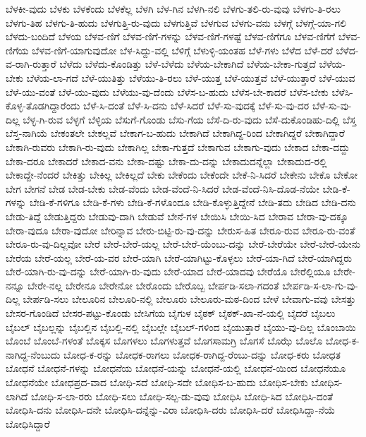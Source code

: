 {ಬೆಳಕೀ-ವುದು
ಬೆಳಕು
ಬೆಳಕೆಂದು
ಬೆಳಕೆಲ್ಲ
ಬೆಳಗಿ
ಬೆಳ-ಗಿನ
ಬೆಳಗಿ-ನಲಿ
ಬೆಳಗು-ತಲಿ-ರು-ವುವು
ಬೆಳಗು-ತಿ-ರಲು
ಬೆಳಗು-ತಿಹ
ಬೆಳಗು-ತಿ-ಹುದು
ಬೆಳಗುತ್ತಿ-ರು-ವುದು
ಬೆಳಗುತ್ತಿವೆ
ಬೆಳಗುವ
ಬೆಳಗು-ವನು
ಬೆಳಗ್ಗೆ
ಬೆಳಗ್ಗೆ-ಯಾ-ಗಲಿ
ಬೆಳದು-ಬಂದಿದೆ
ಬೆಳಯ
ಬೆಳವ-ಣಿಗೆ
ಬೆಳವ-ಣಿಗೆ-ಗಳನ್ನು
ಬೆಳವ-ಣಿಗೆ-ಗಳಷ್ಟೆ
ಬೆಳವ-ಣಿಗೆಗೂ
ಬೆಳವ-ಣಿಗೆಗೆ
ಬೆಳವ-ಣಿಗೆಯ
ಬೆಳವ-ಣಿಗೆ-ಯಾಗುವುದೋ
ಬೆಳ-ಸಿದ್ದು-ವಲ್ಲಿ
ಬೆಳಿಗ್ಗೆ
ಬೆಳುಳ್ಳಿ-ಯಂತಹ
ಬೆಳೆ-ಗಳು
ಬೆಳೆದ
ಬೆಳೆ-ದರೆ
ಬೆಳೆದ-ವ-ರಾಗಿ-ರುತ್ತಾರೆ
ಬೆಳೆದು
ಬೆಳೆದು-ಕೊಂಡಿತ್ತು
ಬೆಳೆ-ಬೆಳೆದು
ಬೆಳೆಯ-ಬೇಕಾಗಿದೆ
ಬೆಳೆಯ-ಬೇಕಾ-ಗುತ್ತದೆ
ಬೆಳೆಯ-ಬೇಕು
ಬೆಳೆಯ-ಲಾ-ಗದೆ
ಬೆಳೆ-ಯುತಿತ್ತು
ಬೆಳೆಯು-ತಿ-ರಲು
ಬೆಳೆ-ಯುತ್ತ
ಬೆಳೆ-ಯುತ್ತವೆ
ಬೆಳೆ-ಯುತ್ತಾರೆ
ಬೆಳೆ-ಯುವ
ಬೆಳೆ-ಯು-ವಂತೆ
ಬೆಳೆ-ಯು-ವುದು
ಬೆಳೆಯು-ವು-ದೆಂದು
ಬೆಳೆಸ-ಬ-ಹುದು
ಬೆಳೆಸ-ಬೇ-ಕಾದರೆ
ಬೆಳೆಸ-ಬೇಕು
ಬೆಳೆಸಿ-ಕೊಳ್ಳ-ತೊಡಗಿದ್ದಾರೆಂದು
ಬೆಳೆ-ಸಿ-ದಂತೆ
ಬೆಳೆ-ಸಿ-ದನು
ಬೆಳೆ-ಸಿದರೆ
ಬೆಳೆ-ಸು-ವುದಕ್ಕೆ
ಬೆಳೆ-ಸು-ವು-ದರ
ಬೆಳೆ-ಸು-ವು-ದಿಲ್ಲ
ಬೆಳ್ಳ-ಗಿ-ರುವ
ಬೆಳ್ಳಗೆ
ಬೆಳ್ಳಿಯ
ಬೆಸುಗೆ-ಗೊಂಡು
ಬೆಸು-ಗೆಯ
ಬೆಸೆ-ದಿ-ರು-ವುದು
ಬೆಸೆ-ದುಕೊಂಡಿಹು-ದಿಲ್ಲಿ
ಬೆಸ್ತ
ಬೆಸ್ತ-ನಾಗಿಯೆ
ಬೇಕಂತಲೇ
ಬೇಕಲ್ಲವೆ
ಬೇಕಾಗ-ಬ-ಹುದು
ಬೇಕಾಗಿದೆ
ಬೇಕಾಗಿದ್ದ-ರಿಂದ
ಬೇಕಾಗಿದ್ದರೆ
ಬೇಕಾಗಿದ್ದಾರೆ
ಬೇಕಾಗಿ-ರುವರು
ಬೇಕಾಗಿ-ರು-ವುದು
ಬೇಕಾಗಿಲ್ಲ
ಬೇಕಾ-ಗುತ್ತದೆ
ಬೇಕಾಗುವ
ಬೇಕಾಗು-ವುದು
ಬೇಕಾದ
ಬೇಕಾ-ದದ್ದು
ಬೇಕಾ-ದರೂ
ಬೇಕಾದರೆ
ಬೇಕಾದ-ವನು
ಬೇಕಾ-ದಷ್ಟು
ಬೇಕಾ-ದು-ದನ್ನು
ಬೇಕಾದುದನ್ನೆಲ್ಲಾ
ಬೇಕಾದುದ-ರಲ್ಲಿ
ಬೇಕಾದ್ದೇ-ನೆಂದರೆ
ಬೇಕಿತ್ತು
ಬೇಕಿಲ್ಲ
ಬೇಕಿಲ್ಲದೆ
ಬೇಕು
ಬೇಕೆಂದು
ಬೇಕೆಂದೇ
ಬೇಕೆ-ನಿ-ಸಿದರೆ
ಬೇಕೇನು
ಬೇಕೊ
ಬೇಕೋ
ಬೇಗ
ಬೇಗನೆ
ಬೇಡ
ಬೇಡ-ಬೇಕು
ಬೇಡ-ವೆಂದು
ಬೇಡ-ವೆಂದೆ-ನಿ-ಸಿದರೆ
ಬೇಡ-ವೆಂದೆ-ನಿಸಿ-ದೊಡ-ನೆಯೇ
ಬೇಡಿ-ಕೆ-ಗಳನ್ನು
ಬೇಡಿ-ಕೆ-ಗಳಿಗೂ
ಬೇಡಿ-ಕೆ-ಗಳು
ಬೇಡಿ-ಕೆ-ಗಳೊಂದೂ
ಬೇಡಿ-ಕೊಳ್ಳುತ್ತಿದ್ದೇನೆ
ಬೇಡಿ-ತದು
ಬೇಡಿದ
ಬೇಡಿ-ದನು
ಬೇಡು-ತಿದ್ದೆ
ಬೇಡುತ್ತಿದ್ದರು
ಬೇಡುವು-ದಾಗಿ
ಬೇಡುವೆ
ಬೇನೆ-ಗಳ
ಬೇಯಿಸಿ
ಬೇಯಿ-ಸಿದ
ಬೇರಾವ
ಬೇರಾ-ವು-ದಕ್ಕೂ
ಬೇರಾ-ವುದೂ
ಬೇರಾ-ವುದೋ
ಬೇರಿನ್ನಾವ
ಬೇರು-ಬಿಟ್ಟಿ-ರು-ವು-ದನ್ನು
ಬೇರುಸ-ಹಿತ
ಬೇರೂ-ರುವ
ಬೇರೂ-ರು-ವಂತೆ
ಬೇರೂ-ರು-ವು-ದಿಲ್ಲವೋ
ಬೇರೆ
ಬೇರೆ-ಬೇರೆ-ಯಲ್ಲ
ಬೇರೆ-ಬೇರೆ-ಯೆಂಬು-ದನ್ನು
ಬೇರೆ-ಬೇರೆಯೇ
ಬೇರೆ-ಬೇರೆ-ಯೇನು
ಬೇರೆಯ
ಬೇರೆ-ಯಲ್ಲ
ಬೇರೆ-ಯ-ವರ
ಬೇರೆ-ಯಾಗಿ
ಬೇರೆ-ಯಾಗಿಟ್ಟು-ಕೊಳ್ಳಲು
ಬೇರೆ-ಯಾ-ಗಿದೆ
ಬೇರೆ-ಯಾಗಿದ್ದರು
ಬೇರೆ-ಯಾಗಿ-ರು-ವು-ದನ್ನು
ಬೇರೆ-ಯಾಗಿ-ರು-ವುದು
ಬೇರೆ-ಯಾದ
ಬೇರೆ-ಯಾದವು
ಬೇರೆಯೊ
ಬೇರೆಲ್ಲಿಯೂ
ಬೇರೇ-ನನ್ನೂ
ಬೇರೇ-ನಲ್ಲ
ಬೇರೇನೂ
ಬೇರೇನೋ
ಬೇರೊಂದು
ಬೇರೊಬ್ಬ
ಬೇರ್ಪಡಿ-ಸಲಾ-ಗದಂತೆ
ಬೇರ್ಪಡಿ-ಸ-ಲಾ-ಗು-ವು-ದಿಲ್ಲ
ಬೇರ್ಪಡಿ-ಸಲು
ಬೇಲೂರಿನ
ಬೇಲೂರಿ-ನಲ್ಲಿ
ಬೇಲೂರು
ಬೇಲೂರು-ಮಠ-ದಿಂದ
ಬೇಳೆ
ಬೇವಾಗು-ವವು
ಬೇಸತ್ತು
ಬೇಸರ-ಗೊಂಡಿದೆ
ಬೇಸರ-ಪಟ್ಟು-ಕೊಂಡು
ಬೇಸಿಗೆಯ
ಬೈಗುಳ
ಬೈಠಕ್
ಬೈಠಕ್-ಖಾ-ನೆ-ಯಲ್ಲಿ
ಬೈದರೆ
ಬೈಬಲು
ಬೈಬಲ್
ಬೈಬಲ್ಲನ್ನು
ಬೈಬಲ್ಲಿನ
ಬೈಬಲ್ಲಿ-ನಲ್ಲಿ
ಬೈಬಲ್ಲೇ
ಬೈಬಲ್-ಗಳಿಂದ
ಬೈಯುತ್ತಾರೆ
ಬೈಯು-ವು-ದಿಲ್ಲ
ಬೊಂಬಾಯಿ
ಬೊಂಬೆ
ಬೊಂಬೆ-ಗಳಂತೆ
ಬೊಕ್ಕಸ
ಬೊಗಳಲು
ಬೊಗಳುತ್ತವೆ
ಬೊಗಸಾಮಗ್ರಿ
ಬೊಗಸೆ
ಬೊಝೆ
ಬೊಲೊ
ಬೋಧ-ಕ-ನಾಗಿದ್ದ-ನೆಂಬುದು
ಬೋಧ-ಕ-ರನ್ನು
ಬೋಧಕ-ರಾಗಲು
ಬೋಧಕ-ರಾಗಿದ್ದ-ರೆಂಬು-ದನ್ನು
ಬೋಧ-ಕರು
ಬೋಧತ
ಬೋಧನೆ
ಬೋಧನೆ-ಗಳನ್ನು
ಬೋಧನೆಯ
ಬೋಧನೆ-ಯನ್ನು
ಬೋಧನೆ-ಯಲ್ಲಿ
ಬೋಧನೆ-ಯಿಂದ
ಬೋಧನೆಯೂ
ಬೋಧನೆಯೇ
ಬೋಧಪ್ರದ-ವಾದ
ಬೋಧಿ-ಸದೆ
ಬೋಧಿ-ಸದೇ
ಬೋಧಿಸ-ಬ-ಹುದು
ಬೋಧಿಸ-ಬೇಕು
ಬೋಧಿಸ-ಲಾಗಿದೆ
ಬೋಧಿ-ಸ-ಲಾ-ರರು
ಬೋಧಿ-ಸಲು
ಬೋಧಿ-ಸಲ್ಪ-ಡು-ವುವು
ಬೋಧಿಸಿ
ಬೋಧಿ-ಸಿದ
ಬೋಧಿಸಿ-ದಂತೆ
ಬೋಧಿಸಿ-ದನು
ಬೋಧಿಸಿ-ದನೇ
ಬೋಧಿಸಿ-ದನ್ನೆನ್ನು-ವಿರಾ
ಬೋಧಿಸಿ-ದರು
ಬೋಧಿಸಿ-ದರೆ
ಬೋಧಿಸಿದ್ದಾ-ನೆಯೆ
ಬೋಧಿಸಿದ್ದಾರೆ
}
